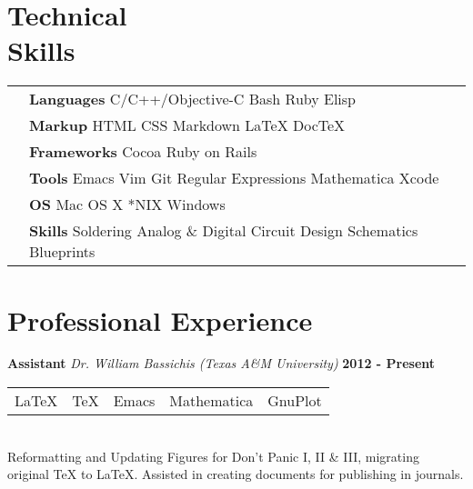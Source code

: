 \documentclass[margin,line,12pt]{res}
\begin{document}
{\begin{resume}
{  \section{\sc Technical \\ Skills}}
\hspace{-.35in}
{\renewcommand{\arraystretch}{1.25}
  \renewcommand{\tabcolsep}{0.175cm}
  \begin{tabular}{l l l}
    & {\bf Languages} C/C++/Objective-C Bash Ruby Elisp \\ %
    & {\bf Markup} HTML CSS Markdown \LaTeX{} Doc\TeX{}\\
    & {\bf Frameworks} Cocoa  Ruby on Rails \\
    & {\bf Tools} Emacs Vim  Git  Regular Expressions Mathematica Xcode \\
    & {\bf OS} Mac OS X *NIX Windows \\
    & {\bf Skills} Soldering  Analog \& Digital Circuit Design  Schematics Blueprints\\
  \end{tabular}}


\vspace*{.20in}
{\color{Black}
  \section{\sc Professional Experience}}
{\bf Assistant} {\em Dr. William Bassichis (Texas A{\&}M University)} \hfill {\bf 2012 - Present} \
\\
\begin{tabular}{l l l l l}
   \LaTeX{} &  \TeX{} &  Emacs &  Mathematica & GnuPlot
\end{tabular}
\\
Reformatting and Updating Figures for Don't Panic I, II \& III,
migrating \\ original \TeX{} to \LaTeX{}. Assisted in creating
documents for publishing in journals.
\vspace{-.13in}




\end{resume}}
\end{document}

